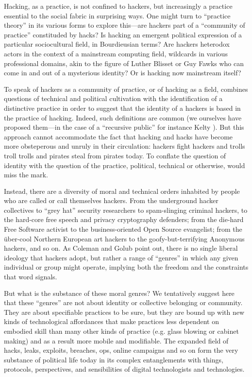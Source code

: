 \documentclass[10pt,letter,oneside]{scrartcl}
\begin{document}
Hacking, as a practice, is not confined to hackers, but increasingly a practice
essential to the social fabric in surprising ways.  One might turn to ``practice
theory'' in its various forms to explore this---are hackers part of a
``community of practice'' constituded by hacks?  Is hacking an emergent
political expression of a particular sociocultural field, in Bourdieusian terms?
Are hackers heterodox actors in the context of a mainstream computing field,
wildcards in various professional domains, akin to the figure of Luther Blisset
or Guy Fawks who can come in and out of a mysterious identity?  Or is hacking
now mainstream itself?  

To speak of hackers as a community of practice, or of hacking as a field,
combines questions of technical and political cultivation with the
identification of a distinctive practice in order to suggest that the identity
of a hackers is based in the practice of hacking.  Indeed, such definitions are
common (we ourselves have proposed them---in the case of a ``recursive public''
for instance Kelty \cite*{kelty_two_2008}).  But this approach cannot accommodate the fact that
hacking and hacks have become more obsteperous and unruly in their circulation:
hackers fight hackers and trolls troll trolls and pirates steal from pirates
today.  To conflate the question of identity with the question of the practice,
political, technical or otherwise, would miss the mark.

Instead, there are a diversity of moral and technical orders inhabited by people
who are called or call themselves hackers. From the underground hacker
collectives to ``grey hat'' security researchers to spam-slinging criminal
hackers, to the hard-core free speech and privacy cryptography defenders; from
the die-hard Free Software activist to the business-oriented Open Source
evangelist; from the über-cool Northern European art hackers to the
goofy-but-terrifying Anonymous hackers, and so on.  As Coleman and Golub
\cite*{coleman_hacker_2008} point out, there is no single liberal ideology that
hackers adopt, but rather a range of ``genres'' in which any given individual or
group might operate, implying both the freedom and the constraints that word
signals.

But what is the substance of these moral genres?  We tentatively suggest here that these
``genres'' are not about identity or collective belonging or community.  They
are about specifiable practices to be sure, but they are bound up with new
kinds of technological affordances that make practices less dependent on
embodied skill than many other kinds of practice (e.g. glass blowing or cabinet
making) and as a result more mobile and modifiable.  The expanded field of
hacks, leaks, exploits, breaches, ops, online campaigns and so on form the very
substance of political life today in its complex entanglements with things,
protocols, perspectives, and sensibilities of digital technologists and
technologies. 
\end{document}
